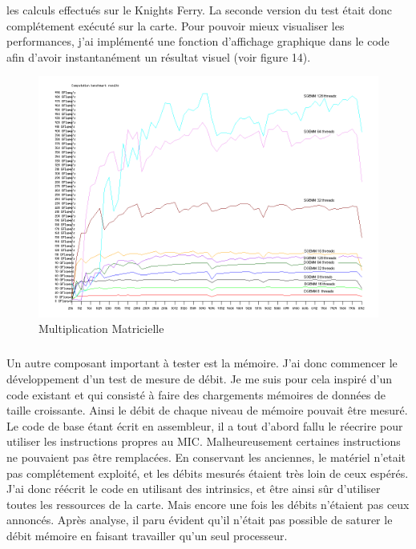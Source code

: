 \documentclass{article}
\begin{document}
					les calculs effectués sur le Knights Ferry. \newline
					La seconde version du test était donc complétement exécuté sur la carte. Pour pouvoir mieux visualiser
					les performances, j'ai implémenté une fonction d'affichage graphique dans le code afin d'avoir instantanément
					un résultat visuel (voir figure 14).
					\begin{figure}
					\begin{center}
					\includegraphics[scale=0.4]{gflops_SGEMM.png}
					\caption{Multiplication Matricielle}
					\end{center}
					\end{figure}
					\subparagraph{}
					Un autre composant important à tester est la mémoire. J'ai donc commencer le développement d'un test de mesure
					de débit. Je me suis pour cela inspiré d'un code existant et qui consisté à faire des chargements mémoires
					de données de taille croissante. Ainsi le débit de chaque niveau de mémoire pouvait être mesuré. Le code de base étant 
					écrit en assembleur, il a tout d'abord fallu le réecrire pour utiliser les instructions propres au MIC. 
					Malheureusement certaines instructions ne pouvaient pas être remplacées. En conservant les anciennes, le 
					matériel n'etait pas complétement exploité, et les débits mesurés étaient très loin de ceux espérés.
					J'ai donc réécrit le code en utilisant des intrinsics, et être ainsi sûr d'utiliser toutes les ressources
					de la carte. Mais encore une fois les débits n'étaient pas ceux annoncés. Après analyse, il paru évident
					qu'il n'était pas possible de saturer le débit mémoire en faisant travailler qu'un seul processeur.
\end{document}
